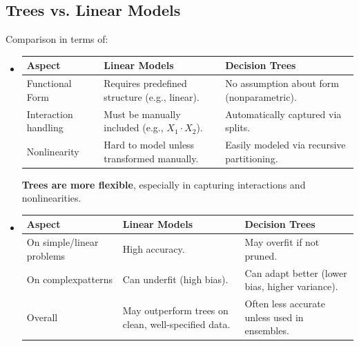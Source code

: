 \subsection{Trees vs. Linear Models}

Comparison in terms of:
\begin{itemize}
    \item {}
    \begin{table}[!htp]
        \centering
        \begin{tabular}{@{} l p{} p{} @{}}
            \toprule
            Aspect & Linear Models & Decision Trees \\
            \midrule
            Functional Form      & Requires predefined structure (e.g., linear).        & No assumption about form (nonparametric).  \\ [.8em]
            Interaction handling & Must be manually included (e.g., $X_1 \cdot X_2$).   & Automatically captured via splits.         \\ [.8em]
            Nonlinearity         & Hard to model unless transformed manually.           & Easily modeled via recursive partitioning. \\
            \bottomrule
        \end{tabular}
    \end{table}

    \textcolor{Green3}{} \textbf{Trees are more flexible}, especially in capturing interactions and nonlinearities.


    \item {}
    \begin{table}[!htp]
        \centering
        \begin{tabular}{@{} p{8em} p{} p{} @{}}
            \toprule
            Aspect & Linear Models & Decision Trees \\
            \midrule
            On simple/linear problems   & High accuracy.                                      & May overfit if not pruned.                      \\ [1.5em]
            On complex\newline patterns & Can underfit (high bias).                           & Can adapt better (lower bias, higher variance). \\ [.6em]
            Overall                     & May outperform trees on clean, well-specified data. & Often less accurate unless used in ensembles.   \\ 
            \bottomrule
        \end{tabular}
    \end{table}


\end{itemize}
